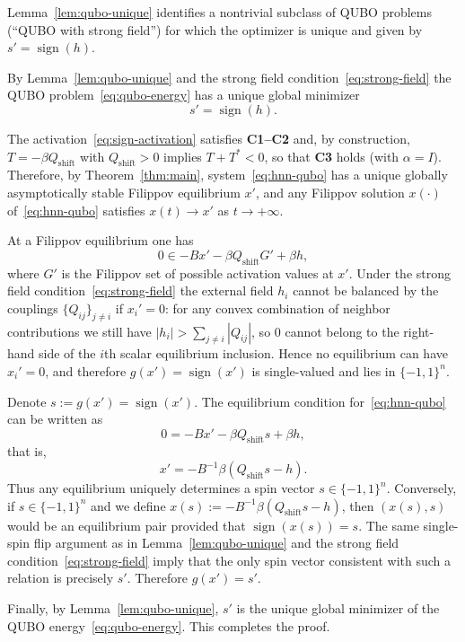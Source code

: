 \documentclass[journal]{IEEEtran}
\theoremstyle{myplain}
\begin{document}
\medskip
Lemma~\ref{lem:qubo-unique} identifies a nontrivial subclass of QUBO problems
(``QUBO with strong field'') for which the optimizer is unique and given by
$s' = \operatorname{sign}(h)$.

\medskip
\begin{IEEEproof}
By Lemma~\ref{lem:qubo-unique} and the strong field
condition~\eqref{eq:strong-field} the QUBO problem~\eqref{eq:qubo-energy}
has a unique global minimizer 
\begin{equation}\label{eq:sign-activation}
s' = \operatorname{sign}(h).
\end{equation}

The activation~\eqref{eq:sign-activation} satisfies \textbf{C1--C2} and, by construction,
$T = -\beta Q_{\mathrm{shift}}$ with $Q_{\mathrm{shift}} > 0$ implies
$T+T^* < 0$, so that \textbf{C3} holds (with $\alpha=I$).
Therefore, by Theorem~\ref{thm:main}, system~\eqref{eq:hnn-qubo}
has a unique globally asymptotically stable Filippov equilibrium $x'$,
and any Filippov solution $x(\cdot)$ of~\eqref{eq:hnn-qubo} satisfies
$x(t) \to x'$ as $t \to +\infty$.

At a Filippov equilibrium one has
\[
  0 \in -B x' - \beta Q_{\mathrm{shift}} G' + \beta h,
\]
where $G'$ is the Filippov set of possible activation values at $x'$.
Under the strong field condition~\eqref{eq:strong-field} the external field
$h_i$ cannot be balanced by the couplings $\{Q_{ij}\}_{j \neq i}$ if $x_i' = 0$:
for any convex combination of neighbor contributions we still have
$|h_i| > \sum_{j \neq i} |Q_{ij}|$, so $0$ cannot belong to the right-hand side
of the $i$th scalar equilibrium inclusion.
Hence no equilibrium can have $x_i' = 0$, and therefore
$g(x') = \operatorname{sign}(x')$ is single-valued and lies in
$\{-1,1\}^n$.

Denote $s := g(x') = \operatorname{sign}(x')$.
The equilibrium condition for~\eqref{eq:hnn-qubo} can be written as
\[
  0 = -B x' - \beta Q_{\mathrm{shift}} s + \beta h,
\]
that is,
\[
  x' = -B^{-1} \beta (Q_{\mathrm{shift}} s - h).
\]
Thus any equilibrium uniquely determines a spin vector $s \in \{-1,1\}^n$.
Conversely, if $s \in \{-1,1\}^n$ and we define
$x(s) := -B^{-1} \beta (Q_{\mathrm{shift}} s - h)$, then $(x(s),s)$ would be
an equilibrium pair provided that $\operatorname{sign}(x(s)) = s$.
The same single-spin flip argument as in Lemma~\ref{lem:qubo-unique} and the
strong field condition~\eqref{eq:strong-field} imply that the only spin vector
consistent with such a relation is precisely $s'$.
Therefore $g(x') = s'$.

Finally, by Lemma~\ref{lem:qubo-unique}, $s'$ is the unique global minimizer
of the QUBO energy~\eqref{eq:qubo-energy}.
This completes the proof.
\end{IEEEproof}
\end{document}
